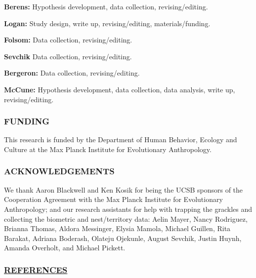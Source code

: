 \documentclass[
]{article}
\begin{document}
\textbf{Berens:} Hypothesis development, data collection,
revising/editing.

\textbf{Logan:} Study design, write up, revising/editing,
materials/funding.

\textbf{Folsom:} Data collection, revising/editing.

\textbf{Sevchik} Data collection, revising/editing.

\textbf{Bergeron:} Data collection, revising/editing.

\textbf{McCune:} Hypothesis development, data collection, data analysis,
write up, revising/editing.

\hypertarget{funding}{%
\subsubsection{FUNDING}\label{funding}}

This research is funded by the Department of Human Behavior, Ecology and
Culture at the Max Planck Institute for Evolutionary Anthropology.

\hypertarget{acknowledgements}{%
\subsubsection{ACKNOWLEDGEMENTS}\label{acknowledgements}}

We thank Aaron Blackwell and Ken Kosik for being the UCSB sponsors of
the Cooperation Agreement with the Max Planck Institute for Evolutionary
Anthropology; and our research assistants for help with trapping the
grackles and collecting the biometric and nest/territory data: Aelin
Mayer, Nancy Rodriguez, Brianna Thomas, Aldora Messinger, Elysia Mamola,
Michael Guillen, Rita Barakat, Adriana Boderash, Olateju Ojekunle,
August Sevchik, Justin Huynh, Amanda Overholt, and Michael Pickett.

\hypertarget{references}{%
\subsubsection*{\texorpdfstring{\href{MyLibrary.bib}{REFERENCES}}{REFERENCES}}\label{references}}
\end{document}
